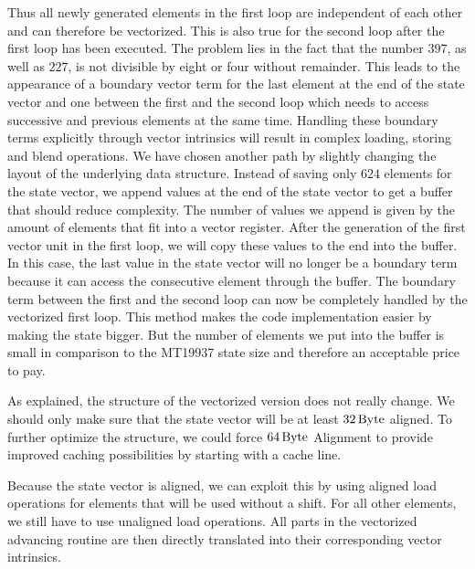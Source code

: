 \documentclass{stdlocal}
\begin{document}
    Thus all newly generated elements in the first loop are independent of each other and can therefore be vectorized.
    This is also true for the second loop after the first loop has been executed.
    The problem lies in the fact that the number $397$, as well as $227$, is not divisible by eight or four without remainder.
    This leads to the appearance of a boundary vector term for the last element at the end of the state vector and one between the first and the second loop which needs to access successive and previous elements at the same time.
    Handling these boundary terms explicitly through vector intrinsics will result in complex loading, storing and blend operations.
    We have chosen another path by slightly changing the layout of the underlying data structure.
    Instead of saving only $624$ elements for the state vector, we append values at the end of the state vector to get a buffer that should reduce complexity.
    The number of values we append is given by the amount of elements that fit into a vector register.
    After the generation of the first vector unit in the first loop, we will copy these values to the end into the buffer.
    In this case, the last value in the state vector will no longer be a boundary term because it can access the consecutive element through the buffer.
    The boundary term between the first and the second loop can now be completely handled by the vectorized first loop.
    This method makes the code implementation easier by making the state bigger.
    But the number of elements we put into the buffer is small in comparison to the MT19937 state size and therefore an acceptable price to pay.

    As explained, the structure of the vectorized version does not really change.
    We should only make sure that the state vector will be at least $32\, \mathrm{Byte}$ aligned.
    To further optimize the structure, we could force $64\, \mathrm{Byte}$ Alignment to provide improved caching possibilities by starting with a cache line.

    Because the state vector is aligned, we can exploit this by using aligned load operations for elements that will be used without a shift.
    For all other elements, we still have to use unaligned load operations.
    All parts in the vectorized advancing routine are then directly translated into their corresponding vector intrinsics.
\end{document}
